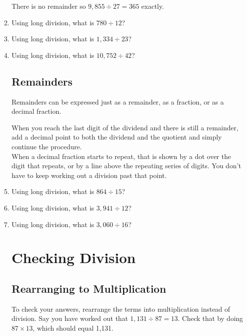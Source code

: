 \documentclass[12pt]{article}
\begin{document}
\begin{enumerate}
There is no remainder so $9,855 \div 27 = 365$ exactly.

\item Using long division, what is $780 \div 12$?
\item Using long division, what is $1,334 \div 23$?
\item Using long division, what is $10,752 \div 42$?

\subsection*{Remainders}
Remainders can be expressed just as a remainder, as a fraction, or as a decimal fraction.\\

\begin{center}
\end{center}

When you reach the last digit of the dividend and there is still a remainder, add a decimal point to both the dividend and the quotient and simply continue the procedure.\\

When a decimal fraction starts to repeat, that is shown by a dot over the digit that repeats, or by a line above the repeating series of digits. You don't have to keep working out a division past that point.\\

\begin{center}
\end{center}

\item Using long division, what is $864 \div 15$?
\item Using long division, what is $3,941 \div 12$?
\item Using long division, what is $3,060 \div 16$?

\section*{Checking Division}

\subsection*{Rearranging to Multiplication}

To check your answers, rearrange the terms into multiplication instead of division. Say you have worked out that $1,131 \div 87 = 13$. Check that by doing $87 \times 13$, which should equal 1,131.\\


\end{enumerate}
\end{document}
